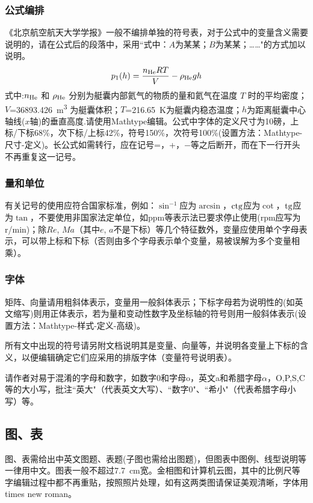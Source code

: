 \documentclass[10.5pt,twocolumn]{jbuaa}
\begin{document}
 \subsubsection{公式编排}
 \label{labSecForm}
 《北京航空航天大学学报》一般不编排单独的符号表，对于公式中的变量含义需要说明的，请在公式后的段落中，采用``式中：$A$为某某；$B$为某某；……"的方式加以说明。
 \begin{equation}
 \label{eqnLabelp}
 p_1 (h) = \dfrac{n_{\textnormal{He}}RT}{V}-\rho_{\textnormal{He}}gh
 \end{equation}
 式中:$n_{\textnormal{He}}$ 和 $\rho_{\textnormal{He}}$ 分别为艇囊内部氦气的物质的量和氦气在温度 $T$ 时的平均密度；
 $V$=\SI{36893.426}{\cubic\meter}%
 为艇囊体积；$T$=\SI{216.65}{\kelvin}为艇囊内稳态温度；$h$为距离艇囊中心轴线($x$轴)的垂直高度.请使用Mathtype编辑。公式中字体的定义尺寸为10磅，上标/下标68\%，次下标/上标42\%，符号150\%，次符号100\%(设置方法：Mathtype-尺寸-定义)。长公式如需转行，应在记号=，+，$-$等之后断开，而在下一行开头不再重复这一记号。
 
 \subsubsection{量和单位}
 有关记号的使用应符合国家标准，例如：$\sin^{-1}$应为$\arcsin$，$\rm ctg$应为$\cot$，$\rm tg$应为$\tan$，不要使用非国家法定单位，如ppm等表示法已要求停止使用(rpm应写为r/min)；除$Re$, $Ma$（其中$e$, $a$不是下标）等几个特征数外，变量应使用单个字母表示，可以带上标和下标（否则由多个字母表示单个变量，易被误解为多个变量相乘）。
 
 \subsubsection{字体}
 矩阵、向量请用粗斜体表示，变量用一般斜体表示；下标字母若为说明性的(如英文缩写)则用正体表示，若为量和变动性数字及坐标轴的符号则用一般斜体表示(设置方法：Mathtype-样式-定义-高级)。
 
 所有文中出现的符号请另附文档说明其是变量、向量等，并说明各变量上下标的含义，以便编辑确定它们应采用的排版字体（变量符号说明表）。
 
 请作者对易于混淆的字母和数字，如数字0和字母o，英文a和希腊字母$\alpha$，O,P,S,C等的大小写，批注``英大"（代表英文大写）、``数字0"、``希小"（代表希腊字母小写）等。
 
 \subsection{图、表}
 图、表需给出中英文图题、表题(子图也需给出图题)，但图表中图例、线型说明等一律用中文。图表一般不超过7.7\ cm宽。金相图和计算机云图，其中的比例尺等字编辑过程中都不再重贴，按照照片处理，如有这两类图请保证美观清晰，字体用times new roman。
 
\end{document}
